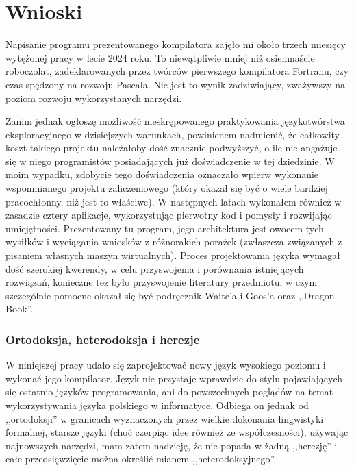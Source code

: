 \chapter{Wnioski}%
Napisanie programu prezentowanego kompilatora zajęło mi około trzech miesięcy wytężonej pracy w lecie 2024 roku. To niewątpliwie mniej niż osiemnaście roboczolat, zadeklarowanych przez twórców pierwszego kompilatora Fortranu\cite{FORTRAN_AUTOMATIC_CODING_SYSTEM}, czy czas spędzony na rozwoju Pascala\cite{Wirth_recollections_Pascal}. Nie jest to wynik zadziwiający, zważywszy na poziom rozwoju wykorzystanych narzędzi.

Zanim jednak ogłoszę możliwość nieskrępowanego praktykowania językotwórstwa eksploracyjnego w dzisiejszych warunkach, powinienem nadmienić, że całkowity koszt takiego projektu należałoby dość znacznie podwyższyć, o ile nie angażuje się w niego programistów posiadających już doświadczenie w tej dziedzinie. W moim wypadku, zdobycie tego doświadczenia oznaczało wpierw wykonanie wspomnianego projektu zaliczeniowego (który okazał się być o wiele bardziej pracochłonny, niż jest to właściwe). W następnych latach wykonałem również w zasadzie cztery aplikacje, wykorzystując pierwotny kod i pomysły i rozwijając umiejętności. Prezentowany tu program, jego architektura jest owocem tych wysiłków i wyciągania wniosków z różnorakich porażek (zwłaszcza związanych z pisaniem własnych maszyn wirtualnych). Proces projektowania języka wymagał dość szerokiej kwerendy, w celu przyswojenia i porównania istniejących rozwiązań, konieczne tez było przyswojenie literatury przedmiotu, w czym szczególnie pomocne okazał się być podręcznik Waite'a i Goos'a\cite{waite_goos} oraz ,,Dragon Book''\cite{DRAGON_BOOK}.

\subsection{Ortodoksja, heterodoksja i herezje}
W niniejszej pracy udało się zaprojektować nowy język wysokiego poziomu i wykonać jego kompilator. Język nie przystaje wprawdzie do stylu pojawiających się ostatnio języków programowania, ani do powszechnych poglądów na temat wykorzystywania języka polskiego w informatyce. Odbiega on jednak od ,,ortodoksji'' w granicach wyznaczonych przez wielkie dokonania lingwistyki formalnej, starsze języki (choć czerpiąc idee również ze współczesności), używając najnowszych narzędzi, mam zatem nadzieję, że nie popada w żadną ,,herezję'' i całe przedsięwzięcie można określić mianem ,,heterodoksyjnego''.

